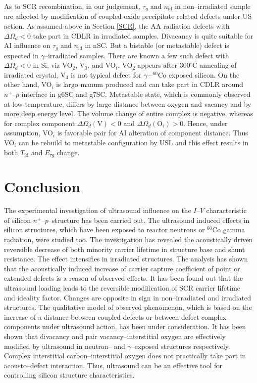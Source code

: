 \documentclass[aip,jap, amsmath,amssymb,reprint]{revtex4-1}
\begin{document}
As to SCR recombination, in our judgement, $\tau_g$ and $n_\mathrm{id}$ in non--irradiated sample
are affected by modification of coupled oxide precipitate related defects under US action.
As assumed above  in Section \ref{SCR},
the AA radiation defects with $\Delta\Omega_d<0$ take part in CDLR in irradiated samples.
Divacancy is quite suitable for AI influence on $\tau_g$ and $n_\mathrm{id}$ in nSC.
But a bistable (or metastable) defect is expected in $\gamma$--irradiated samples.
There are known a few such defect with $\Delta\Omega_d<0$ in Si,
viz VO$_2$,\cite{V2Obistable}
V$_3$,\cite{V3:Markevich}
and VO$_i$.\cite{Bistable:UFN}
VO$_2$ appears after $300^\circ$C annealing of irradiated crystal,
V$_3$ is not typical defect for $\gamma-^{60}$Co exposed silicon.
On the other hand, VO$_i$ is largo manum produced and can take part in CDLR around $n^+$--$p$
interface in g6SC and g7SC.
Metastable state, which is commonly observed at low temperature, differs by large distance between oxygen and vacancy and
by  more deep energy level.\cite{Bistable:UFN}
The volume change of entire complex is negative,
whereas for complex component $\Delta\Omega_d(\mbox{V})<0$ and
$\Delta\Omega_d(\mbox{O}_i)>0$.
Hence, under assumption, VO$_i$ is favorable pair for AI alteration of component distance.
Thus VO$_i$ can be rebuild to metastable configuration by USL and
this effect results in  both $T_{\mathrm{id}}$ and $E_{\tau g}$ change.



\section{Conclusion}
The experimental investigation of ultrasound influence on the $I$--$V$ characteristic of silicon $n^+$--$p$--structure has been carried out.
The ultrasound induced effects in silicon structures, which have been exposed to reactor neutrons or $^{60}$Co gamma radiation, were studied too.
The investigation has revealed the acoustically driven reversible decrease of both minority carrier lifetime in structure base and shunt resistance.
The effect intensifies in irradiated structures.
The analysis has shown that the acoustically induced increase of carrier capture coefficient of point or extended defects is a reason of observed effects.
It has been found out that the ultrasound loading leads to the reversible modification of SCR carrier lifetime and ideality factor.
Changes are opposite in sign in non--irradiated and irradiated structures.
The qualitative model of observed phenomenon, which is based on the increase of a distance between coupled defects or between defect complex components under ultrasound action, has been under consideration.
It has been shown that divacancy and pair vacancy--interstitial oxygen are effectively modified by ultrasound in neutron-- and $\gamma$--exposed structures respectively.
Complex interstitial carbon--interstitial oxygen does not practically take part in acousto--defect interaction.
Thus, ultrasound can be an effective tool for controlling silicon structure characteristics.


\end{document}
